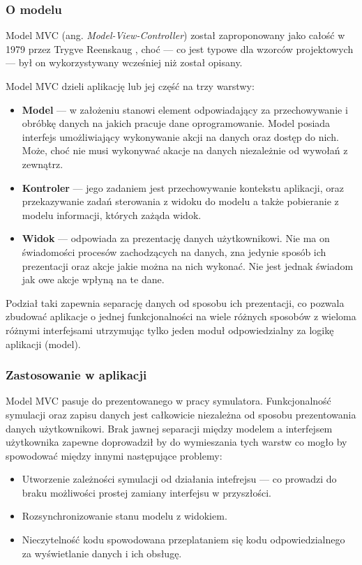 {\subsubsection{O modelu}
\par{
Model MVC (ang. \textit{Model-View-Controller}) został zaproponowany jako całość w 1979 przez Trygve Reenskaug \cite{MVC}, choć --- co jest typowe dla wzorców projektowych --- był on wykorzystywany wcześniej niż został opisany. 
}
\par{
Model MVC dzieli aplikację lub jej część na trzy warstwy:
\begin{itemize}
\item \textbf{Model} --- w założeniu stanowi element odpowiadający za przechowywanie i obróbkę danych na jakich pracuje dane oprogramowanie. Model posiada interfejs umożliwiający wykonywanie akcji na danych oraz dostęp do nich. Może, choć nie musi wykonywać akacje na danych niezależnie od wywołań z zewnątrz.
\item \textbf{Kontroler} --- jego zadaniem jest przechowywanie kontekstu aplikacji, oraz przekazywanie zadań sterowania z widoku do modelu a także pobieranie z modelu informacji, których zażąda widok.
\item \textbf{Widok} --- odpowiada za prezentację danych użytkownikowi. Nie ma on świadomości procesów zachodzących na danych, zna jedynie sposób ich prezentacji oraz akcje jakie można na nich wykonać. Nie jest jednak świadom jak owe akcje wpłyną na te dane.
\end{itemize}
}
\par{
Podział taki zapewnia separację danych od sposobu ich prezentacji, co pozwala zbudować aplikacje o jednej funkcjonalności na wiele różnych sposobów z wieloma różnymi interfejsami utrzymując tylko jeden moduł odpowiedzialny za logikę aplikacji (model).
}
\subsubsection{Zastosowanie w aplikacji}
\par{
Model MVC pasuje do prezentowanego w pracy symulatora. Funkcjonalność symulacji oraz zapisu danych jest całkowicie niezależna od sposobu prezentowania danych użytkownikowi. Brak jawnej separacji między modelem a interfejsem użytkownika zapewne doprowadził by do wymieszania tych warstw co mogło by spowodować między innymi następujące problemy:
\begin{itemize}
\renewcommand{\labelitemi}{$\bullet$}
\item Utworzenie zależności symulacji od działania intefrejsu --- co prowadzi do braku możliwości prostej zamiany interfejsu w przyszłości.
\item Rozsynchronizowanie stanu modelu z widokiem.
\item Nieczytelność kodu spowodowana przeplataniem się kodu odpowiedzialnego za wyświetlanie danych i ich obsługę.
\end{itemize}
}
}
